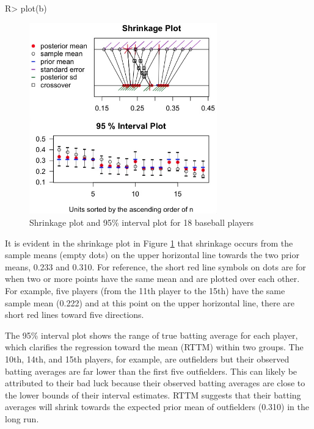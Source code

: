 \documentclass[article]{jss}
\begin{document}
\begin{CodeChunk}
\begin{CodeInput}
R> plot(b)
\end{CodeInput}
\end{CodeChunk}
\begin{figure}[h]
\begin{center}
\includegraphics[width = 3.2in]{baseball1.png}
\caption{Shrinkage plot and 95\% interval plot for 18 baseball players}
\label{fig:baseball}
\end{center}
\end{figure}

It is evident in the shrinkage plot in Figure \ref{fig:baseball} that shrinkage occurs from the sample means (empty dots) on the upper horizontal line towards the two prior means, 0.233 and 0.310. For reference, the short red line symbols on dots are for when two or more points have the same mean and are plotted over each other. For example, five players (from the 11th player to the 15th) have the same sample mean (0.222) and at this point on the upper horizontal line, there are short red lines toward five directions.



The 95\% interval plot shows the range of true batting average for each player, which clarifies the regression toward the mean (RTTM) within two groups. The 10th, 14th, and 15th players, for example, are outfielders but their observed batting averages are far lower than the first five outfielders. This can likely be attributed to their bad luck because their observed batting averages are close to the lower bounds of their interval estimates. RTTM suggests that their batting averages will shrink towards the expected prior mean of outfielders (0.310) in the long run.
\end{document}
